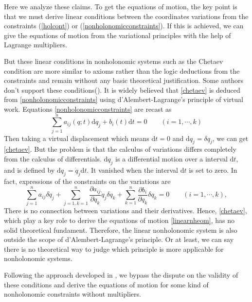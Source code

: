 \documentclass[preprint,11pt]{elsarticle}
\newcommand{\mathd}{\mathrm{d}}
\begin{document}
Here we analyze these claims.
To get the equations of motion, the key point is that we must derive linear conditions between the coordinates variations from the constraints (\ref{holcont}) or (\ref{nonholonomicconstraints}). If this is achieved, we can give the equations of motion from the variational principles with the help of Lagrange multipliers.

But these linear conditions in nonholonomic systems such as the Chetaev condition are more similar to axioms rather than the logic deductions from the
constraints and remain without any basic theoretical justification.
Some authors don't support these conditions(\cite{guo1994}).
It is widely believed that \eqref{chetaev} is deduced from \eqref{nonholonomicconstraints} using d'Alembert-Lagrange's principle of virtual work. Equations \eqref{nonholonomicconstraints} are recast as
\begin{equation}
  \sum_{j = 1}^n a_{i j} ( q ; t) \mathd q_j + b_i ( t) \mathd t= 0 \hspace{2em} ( i =
  1, \cdots, k)
\end{equation}
Then taking a virtual displacement which means $\mathd t=0$ and $\mathd q_j = \delta q_j$, we can get \eqref{chetaev}.
But the problem is that the calculus of variations differs completely from the calculus of differentials.
$\mathd q_j$ is a differential motion over a interval $\mathd t$, and is defined by $\mathd q_j=\dot{q}_j \mathd t$. It vanished when the interval $\mathd t$ is set to zero. In fact, expressions of the constraints on the variations are
\begin{equation}
  \sum_{j = 1}^n a_{i j}  \delta \dot{ q}_j +  \sum_{j = 1,k=1}^n \frac{\partial a_{i j} }{\partial q_k} \dot{ q}_j \delta q_k +\sum_{k=1}^n \frac{\partial b_i }{\partial q_k}\delta q_k = 0 \hspace{2em} ( i =
  1, \cdots, k),
\end{equation}
There is no connection between variations and their derivatives.
Hence, \eqref{chetaev}, which play a key role to derive the equations of motion \eqref{linearnheom}, has no solid theoretical fundament. Therefore, the linear nonholonomic system is also outside the scope of d'Alembert-Lagrange's principle. Or at least, we can say there is no theoretical way to judge which principle is more applicable for nonholonomic systems.


Following the approach developed in \cite{Gao2005}, we bypass the dispute on the validity of these conditions and derive the equations of motion for some kind of nonholonomic constraints without multipliers.
\end{document}
